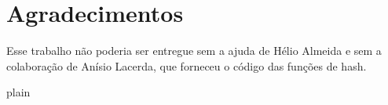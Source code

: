 \documentclass[10pt,twocolumn]{article}
\begin{document}
%
%
%
%
%

\section{Agradecimentos}

Esse trabalho não poderia ser entregue sem a ajuda de Hélio Almeida e
sem a colaboração de  Anísio Lacerda, que forneceu o código das funções
de hash.



 {plain}

\end{document}

